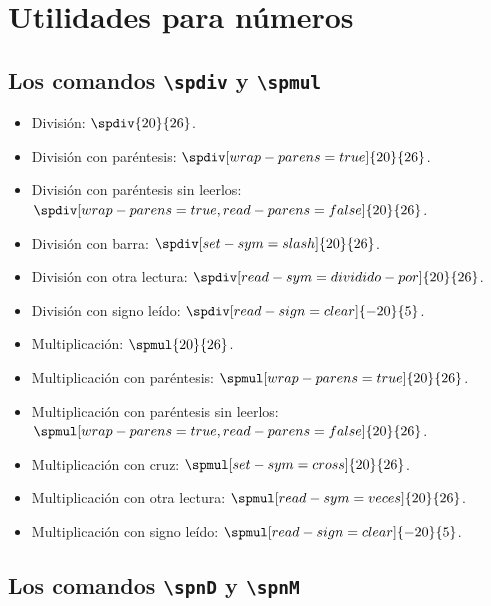 \documentclass{article}
\begin{document}
\section*{Utilidades para números}

\subsection*{Los comandos \texttt{\textbackslash spdiv} y \texttt{\textbackslash spmul}}

\begin{itemize}
  \item División: $\spdiv{20}{26}$.
  \item División con paréntesis: $\spdiv[wrap-parens=true]{20}{26}$.
  \item División con paréntesis sin leerlos: $\spdiv[wrap-parens=true,read-parens=false]{20}{26}$.
  \item División con barra: $\spdiv[set-sym=slash]{20}{26}$.
  \item División con otra lectura: $\spdiv[read-sym=dividido-por]{20}{26}$.
  \item División con signo leído: $\spdiv[read-sign=clear]{-20}{5}$.
  \item Multiplicación: $\spmul{20}{26}$.
  \item Multiplicación con paréntesis: $\spmul[wrap-parens=true]{20}{26}$.
  \item Multiplicación con paréntesis sin leerlos: $\spmul[wrap-parens=true,read-parens=false]{20}{26}$.
  \item Multiplicación con cruz: $\spmul[set-sym=cross]{20}{26}$.
  \item Multiplicación con otra lectura: $\spmul[read-sym=veces]{20}{26}$.
  \item Multiplicación con signo leído: $\spmul[read-sign=clear]{-20}{5}$.
\end{itemize}

\subsection*{Los comandos \texttt{\textbackslash spnD} y \texttt{\textbackslash spnM}}
\end{document}
